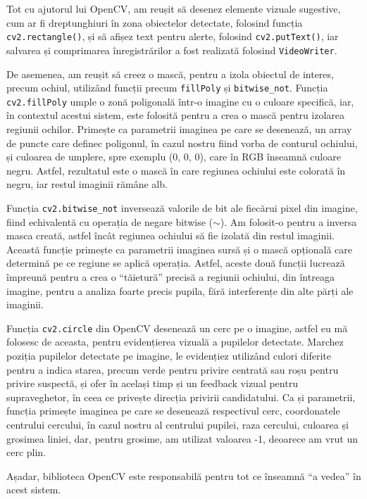 \documentclass[12pt,a4paper]{article}
\begin{document}
Tot cu ajutorul lui OpenCV, am reușit să desenez elemente vizuale
sugestive, cum ar fi dreptunghiuri în zona obiectelor detectate,
folosind funcția \texttt{cv2.rectangle()}, și să afișez text pentru alerte,
folosind \texttt{cv2.putText()}, iar salvarea și comprimarea înregistrărilor a
fost realizată folosind \texttt{VideoWriter}.

De asemenea, am reușit să creez o mască, pentru a izola obiectul de
interes, precum ochiul, utilizând funcții precum \texttt{fillPoly} și
\texttt{bitwise\_not}. Funcția \texttt{cv2.fillPoly} umple o zonă poligonală într-o imagine
cu o culoare specifică, iar, în contextul acestui sistem, este folosită
pentru a crea o mască pentru izolarea regiunii ochilor. Primește ca
parametrii imaginea pe care se desenează, un array de puncte care
definec poligonul, în cazul nostru fiind vorba de conturul ochiului, și
culoarea de umplere, spre exemplu (0, 0, 0), care în RGB înseamnă
culoare negru. Astfel, rezultatul este o mască în care regiunea ochiului
este colorată în negru, iar restul imaginii rămâne alb.

Funcția \texttt{cv2.bitwise\_not} inversează valorile de bit ale fiecărui pixel
din imagine, fiind echivalentă cu operația de negare bitwise ($\sim$). Am
folosit-o pentru a inversa masca creată, astfel încât regiunea ochiului
să fie izolată din restul imaginii. Această funcție primește ca
parametrii imaginea sursă și o mască opțională care determină pe ce
regiune se aplică operația. Astfel, aceste două funcții lucrează
împreună pentru a crea o ``tăietură'' precisă a regiunii ochiului, din
întreaga imagine, pentru a analiza foarte precis pupila, fără
interferențe din alte părți ale imaginii.

Funcția \texttt{cv2.circle} din OpenCV desenează un cerc pe o imagine, astfel eu
mă folosesc de aceasta, pentru evidențierea vizuală a pupilelor
detectate. Marchez poziția pupilelor detectate pe imagine, le evidențiez
utilizând culori diferite pentru a indica starea, precum verde pentru
privire centrată sau roșu pentru privire suspectă, și ofer în același
timp și un feedback vizual pentru supraveghetor, în ceea ce privește
direcția privirii candidatului. Ca și parametrii, funcția primește
imaginea pe care se desenează respectivul cerc, coordonatele centrului
cercului, în cazul nostru al centrului pupilei, raza cercului, culoarea
și grosimea liniei, dar, pentru grosime, am utilizat valoarea -1,
deoarece am vrut un cerc plin.

Așadar, biblioteca OpenCV este responsabilă pentru tot ce înseamnă ``a
vedea'' în acest sistem.
\end{document}
